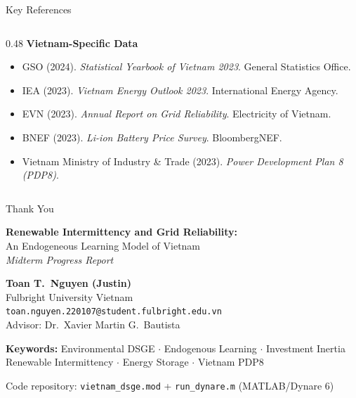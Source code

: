 \documentclass[aspectratio=169,10pt]{beamer}
\begin{document}
\begin{frame}{Key References}
\begin{columns}[T]
\begin{column}{0.48\textwidth}
      \vspace{0.4em}
      \textbf{\textcolor{fuvblue}{Vietnam-Specific Data}}
      \begin{itemize}\scriptsize
        \item GSO (2024). \textit{Statistical Yearbook of Vietnam 2023}. General Statistics Office.
        \item IEA (2023). \textit{Vietnam Energy Outlook 2023}. International Energy Agency.
        \item EVN (2023). \textit{Annual Report on Grid Reliability}. Electricity of Vietnam.
        \item BNEF (2023). \textit{Li-ion Battery Price Survey}. BloombergNEF.
        \item Vietnam Ministry of Industry \& Trade (2023). \textit{Power Development Plan 8 (PDP8)}.
      \end{itemize}
    \end{column}
  \end{columns}
\end{frame}

\begin{frame}{Thank You}
  \begin{center}
    \vspace{0.5em}
    {\Large \textbf{Renewable Intermittency and Grid Reliability:}}\\[4pt]
    {\large An Endogeneous Learning Model of Vietnam}\\[8pt]
    {\normalsize \textit{Midterm Progress Report}}
    \vspace{1em}

    \begin{keybox}[title=Contact]
      \centering
      \textbf{Toan T.\ Nguyen (Justin)}\\
      Fulbright University Vietnam\\[4pt]
      \texttt{toan.nguyen.220107@student.fulbright.edu.vn}\\[4pt]
      Advisor: Dr.\ Xavier Martin G.\ Bautista
    \end{keybox}
    \vspace{1em}

    {\small \textbf{Keywords:} Environmental DSGE $\cdot$ Endogenous Learning $\cdot$ Investment Inertia\\
    Renewable Intermittency $\cdot$ Energy Storage $\cdot$ Vietnam PDP8}
    \vspace{0.8em}

    {\footnotesize \textcolor{fuvblue!60}{Code repository: \texttt{vietnam\_dsge.mod} + \texttt{run\_dynare.m} (MATLAB/Dynare 6)}}
  \end{center}
\end{frame}
\end{document}
